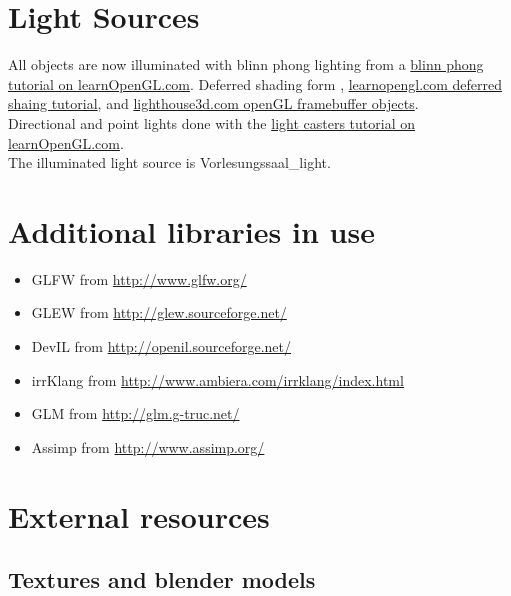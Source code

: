 \documentclass[12pt]{article}
\begin{document}
\section{Light Sources \label{lightSources}}
All objects are now illuminated with blinn phong lighting from a \href{http://learnopengl.com/#!Advanced-Lighting/Advanced-Lighting}{blinn phong tutorial on learnOpenGL.com}. Deferred shading form \cite{openGLSuperBible}, \href{http://learnopengl.com/#!Advanced-Lighting/Deferred-Shading}{learnopengl.com deferred shaing tutorial}, and \href{http://www.lighthouse3d.com/tutorials/opengl_framebuffer_objects/}{lighthouse3d.com openGL framebuffer objects}.\\

Directional and point lights done with the \href{http://learnopengl.com/#!Lighting/Light-casters}{light casters tutorial on learnOpenGL.com}.\\


The illuminated light source is Vorlesungssaal\_light.

\section{Additional libraries in use}

\begin{itemize}
\item GLFW from \url{http://www.glfw.org/}
\item GLEW from \url{http://glew.sourceforge.net/}
\item DevIL from \url{http://openil.sourceforge.net/}
\item irrKlang from \url{http://www.ambiera.com/irrklang/index.html}
\item GLM from \url{http://glm.g-truc.net/} 
\item Assimp from \url{http://www.assimp.org/}
\end{itemize}


\section{External resources}

\subsection{Textures and blender models}
\end{document}

